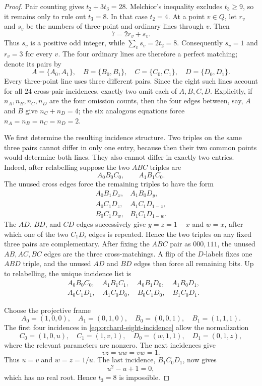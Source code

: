 \begin{proof}
Pair counting gives \(t_2+3t_3=28\).  Melchior's inequality excludes
\(t_3\geq9\), so it remains only to rule out \(t_3=8\).  In that case
\(t_2=4\).  At a point \(v\in Q\), let \(r_v\) and \(s_v\) be the numbers
of three-point and ordinary lines through \(v\).  Then
\[
 7=2r_v+s_v.
\]
Thus \(s_v\) is a positive odd integer, while
\(\sum_v s_v=2t_2=8\).  Consequently \(s_v=1\) and \(r_v=3\) for every
\(v\).  The four ordinary lines are therefore a perfect matching; denote
its pairs by
\[
 A=\{A_0,A_1\},\quad B=\{B_0,B_1\},\quad
 C=\{C_0,C_1\},\quad D=\{D_0,D_1\}.
\]
Every three-point line uses three different pairs.  Since the eight such
lines account for all \(24\) cross-pair incidences, exactly two omit each
of \(A,B,C,D\).  Explicitly, if \(n_A,n_B,n_C,n_D\) are the four
omission counts, then the four edges between, say, \(A\) and \(B\) give
\(n_C+n_D=4\); the six analogous equations force
\(n_A=n_B=n_C=n_D=2\).

We first determine the resulting incidence structure.  Two triples on the
same three pairs cannot differ in only one entry, because then their two
common points would determine both lines.  They also cannot differ in
exactly two entries.  Indeed, after relabelling suppose the two \(ABC\)
triples are
\[
 A_0B_0C_0,\qquad A_1B_1C_0.
\]
The unused cross edges force the remaining triples to have the form
\[
\begin{array}{ll}
 A_0B_1D_x,&A_1B_0D_y,\\
 A_0C_1D_z,&A_1C_1D_{1-z},\\
 B_0C_1D_w,&B_1C_1D_{1-w}.
\end{array}
\]
The \(AD\), \(BD\), and \(CD\) edges successively give
\(y=z=1-x\) and \(w=x\), after which one of the two \(C_1D_i\) edges is
repeated.  Hence the two triples on any fixed three pairs are complementary.
After fixing the \(ABC\) pair as \(000,111\), the unused \(AB,AC,BC\)
edges are the three cross-matchings.  A flip of the \(D\)-labels fixes one
\(ABD\) triple, and the unused \(AD\) and \(BD\) edges then force all
remaining bits.  Up to relabelling, the unique incidence list is
\begin{equation}\label{eq:orchard-eight-incidence}
\begin{split}
&A_0B_0C_0,\quad A_1B_1C_1,\quad
 A_0B_1D_0,\quad A_1B_0D_1,\\
&A_0C_1D_1,\quad A_1C_0D_0,\quad
 B_0C_1D_0,\quad B_1C_0D_1.
\end{split}
\end{equation}

Choose the projective frame
\[
 A_0=(1,0,0),\quad A_1=(0,1,0),\quad
 B_0=(0,0,1),\quad B_1=(1,1,1).
\]
The first four incidences in \eqref{eq:orchard-eight-incidence} allow the
normalization
\[
 C_0=(1,0,u),\quad C_1=(1,v,1),\quad
 D_0=(w,1,1),\quad D_1=(0,1,z),
\]
where the relevant parameters are nonzero.  The next incidences give
\[
 vz=uw=vw=1.
\]
Thus \(u=v\) and \(w=z=1/u\).  The last incidence,
\(B_1C_0D_1\), now gives
\[
 u^2-u+1=0,
\]
which has no real root.  Hence \(t_3=8\) is impossible.
\end{proof}

